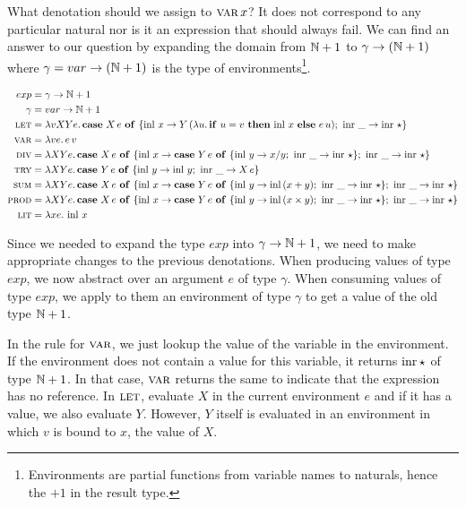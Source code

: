 What denotation should we assign to $\textsc{var}\,x$? It does not correspond to
any particular natural nor is it an expression that should always fail. We
can find an answer to our question by expanding the domain from $\mathbb{N} + 1$
to $\gamma \to (\mathbb{N} + 1)$ where $\gamma = var \to (\mathbb{N} + 1)$ is the type of
environments\footnote{Environments are partial functions from variable
  names to naturals, hence the $+ 1$ in the result type.}.

\begin{align*}
  exp &= \gamma \to \mathbb{N} + 1 \\
  \gamma &= var \to \mathbb{N} + 1 \\
  \textsc{let} &= \lambda v X Y e.\, \text{\textbf{case} $X\,e$ \textbf{of} $\{ \operatorname{inl}\,x \to Y\,(\lambda u.\, \text{\textbf{if} $u = v$ \textbf{then} $\operatorname{inl}\,x$ \textbf{else} $e\,u$});\ \operatorname{inr}\,\_ \to \operatorname{inr}\,\star \}$} \\
  \textsc{var} &= \lambda v e.\, e\,v \\
  \textsc{div} &= \lambda X Y e.\, \text{\textbf{case} $X\,e$ \textbf{of} $\{ \operatorname{inl}\,x \to \text{\textbf{case} $Y\,e$ \textbf{of} $\{ \operatorname{inl}\,y \to x / y;\ \operatorname{inr}\,\_ \to \operatorname{inr}\,\star \}$};\ \operatorname{inr}\,\_ \to \operatorname{inr}\,\star \}$} \\ 
  \textsc{try} &= \lambda X Y e.\, \text{\textbf{case} $Y\,e$ \textbf{of} $\{ \operatorname{inl}\,y \to \operatorname{inl}\,y;\ \operatorname{inr}\,\_ \to X\,e \}$} \\ 
  \textsc{sum} &= \lambda X Y e.\, \text{\textbf{case} $X\,e$ \textbf{of} $\{ \operatorname{inl}\,x \to \text{\textbf{case} $Y\,e$ \textbf{of} $\{ \operatorname{inl}\,y \to \operatorname{inl}\,(x + y);\ \operatorname{inr}\,\_ \to \operatorname{inr}\,\star \}$};\ \operatorname{inr}\,\_ \to \operatorname{inr}\,\star \}$} \\ 
  \textsc{prod} &= \lambda X Y e.\, \text{\textbf{case} $X\,e$ \textbf{of} $\{ \operatorname{inl}\,x \to \text{\textbf{case} $Y\,e$ \textbf{of} $\{ \operatorname{inl}\,y \to \operatorname{inl}\,(x \times y);\ \operatorname{inr}\,\_ \to \operatorname{inr}\,\star \}$};\ \operatorname{inr}\,\_ \to \operatorname{inr}\,\star \}$} \\ 
  \textsc{lit} &= \lambda x e.\, \operatorname{inl}\,x
\end{align*}

Since we needed to expand the type $exp$ into $\gamma \to \mathbb{N} + 1$, we need
to make appropriate changes to the previous denotations. When producing
values of type $exp$, we now abstract over an argument $e$ of type
$\gamma$. When consuming values of type $exp$, we apply to them an
environment of type $\gamma$ to get a value of the old type $\mathbb{N} + 1$.

In the rule for $\textsc{var}$, we just lookup the value of the variable in the
environment. If the environment does not contain a value for this variable,
it returns $\operatorname{inr}{\star}$ of type $\mathbb{N} + 1$. In that case, $\textsc{var}$ returns
the same to indicate that the expression has no reference. In $\textsc{let}$,
evaluate $X$ in the current environment $e$ and if it has a value, we also
evaluate $Y$. However, $Y$ itself is evaluated in an environment in which
$v$ is bound to $x$, the value of $X$.


